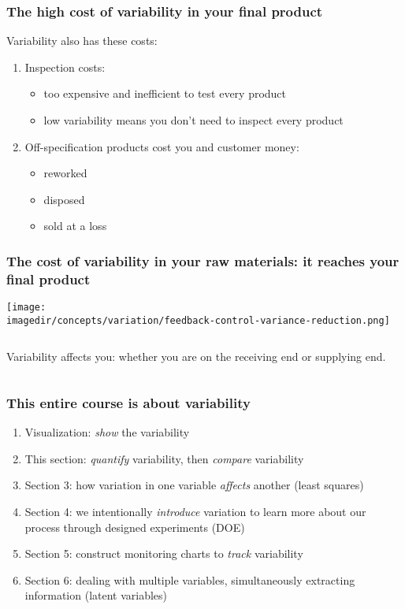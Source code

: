 \begin{frame}\frametitle{The high cost of variability in your final product}
	Variability also has these costs:
	
	\vspace{12pt}
	\begin{enumerate}
		\item	Inspection costs:
		\begin{itemize}
			\item	too expensive and inefficient to test every product
			\item	low variability means you don't need to inspect every product
		\end{itemize}
		\item	Off-specification products cost you and customer money:
		\begin{itemize}
			\item	reworked
			\item	disposed
			\item	sold at a loss
		\end{itemize}
	\end{enumerate}
\end{frame}

\begin{frame}\frametitle{The cost of variability in your raw materials: it reaches your final product}
	
	\centerline{\texttt{[image: \\imagedir/concepts/variation/feedback-control-variance-reduction.png]}}
	\begin{columns}[T]
		\vspace{-2.5cm}
		\begin{exampleblock}{}
			{\color{myGreen} Variability affects you: whether you are on the receiving end or supplying end.}
		\end{exampleblock}	
	\end{columns}
\end{frame}

\begin{frame}\frametitle{This entire course is about variability}
	\begin{enumerate}
		\item	Visualization: \emph{\color{blue}show} the variability
		\item	This section: \emph{\color{blue}quantify} variability, then \emph{\color{blue}compare} variability
		\item	Section 3: how variation in one variable \emph{\color{blue}affects} another (least squares)
		\item	Section 4: we intentionally \emph{\color{blue}introduce} variation to learn more about our process through designed experiments (DOE)
		\item	Section 5: construct monitoring charts to \emph{\color{blue}track} variability
		\item	Section 6: dealing with multiple variables, simultaneously extracting information (latent variables)
	\end{enumerate}
\end{frame}

